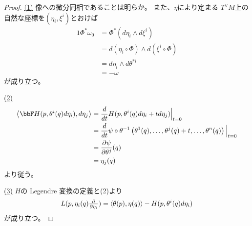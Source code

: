 \documentclass[report]{jlreq}
\begin{document}
\begin{proof}
    \uline{(1)} \quad
    像への微分同相であることは明らか。
    また、$\eta$により定まる
    $T^\vee M$上の自然な座標を$(\eta_i, \xi^i)$とおけば
    \begin{alignat}{1}
        \Phi^* \omega_0
            &=
                \Phi^* (d\eta_i \wedge d\xi^i)
                \\
            &=
                d(\eta_i \circ \Phi) \wedge d(\xi^i \circ \Phi)
                \\
            &=
                d\eta_i \wedge d\theta^{*i}
                \\
            &=
                - \omega
    \end{alignat}
    が成り立つ。

    \uline{(2)} \quad
    \begin{alignat}{1}
        \myangle{
            \bbF H(p, \theta^i(q) d\eta_i)
        }{
            d\eta_j
        }
            &=
                \dd{t}
                H(p, \theta^i(q) d\eta_i + t d\eta_j) \Big|_{t = 0}
                \\
            &=
                \dd{t}
                \psi \circ \theta^{-1} \myparen{
                    \theta^1(q), \dots, \theta^j(q) + t, \dots, \theta^n(q)
                }
                \Big|_{t = 0}
                \\
            &=
                \deldel[\psi]{\theta^j}(q)
                \\
            &=
                \eta_j(q)
    \end{alignat}
    より従う。

    \uline{(3)} \quad
    $H$の Legendre 変換の定義と(2)より
    \begin{equation}
        L(p, \eta_i(q) \tdeldel{\eta_i})
            =
                \myangle{\theta(p)}{\eta(q)}
                -
                H(p, \theta^i(q) d\eta_i)
    \end{equation}
    が成り立つ。
\end{proof}
\end{document}
